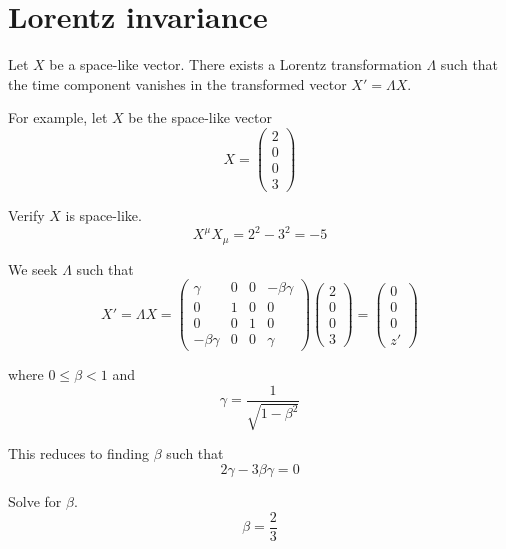 

\section*{Lorentz invariance}

Let $X$ be a space-like vector.
There exists a Lorentz transformation $\Lambda$ such that the
time component vanishes in the transformed vector $X'=\Lambda X$.

\bigskip
For example, let $X$ be the space-like vector
\begin{equation*}
X=\begin{pmatrix}2\\0\\0\\3\end{pmatrix}
\end{equation*}

Verify $X$ is space-like.
\begin{equation*}
X^\mu X_\mu=2^2-3^2=-5
\end{equation*}

We seek $\Lambda$ such that
\begin{equation*}
X'=\Lambda X=\begin{pmatrix}
\gamma & 0 & 0 & -\beta\gamma
\\
0 & 1 & 0 & 0
\\
0 & 0 & 1 & 0
\\
-\beta\gamma & 0 & 0 & \gamma
\end{pmatrix}
\begin{pmatrix}2\\0\\0\\3\end{pmatrix}
=\begin{pmatrix}0\\0\\0\\z'\end{pmatrix}
\end{equation*}

where $0\le\beta<1$ and
\begin{equation*}
\gamma=\frac{1}{\sqrt{1-\beta^2}}
\end{equation*}

This reduces to finding $\beta$ such that
\begin{equation*}
2\gamma-3\beta\gamma=0
\end{equation*}

Solve for $\beta$.
\begin{equation*}
\beta=\frac{2}{3}
\end{equation*}


